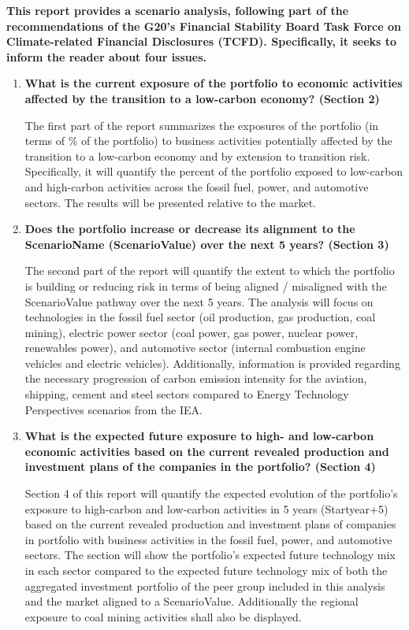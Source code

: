 \documentclass[10pt,table,a4]{article}\usepackage[]{graphicx}\usepackage[]{color}
\begin{document}
	\begin{multicols}{2}
		
		\textbf{This report provides a scenario analysis, following part of the recommendations of the G20's Financial Stability Board Task Force on Climate-related Financial Disclosures (TCFD). Specifically, it seeks to inform the reader about four issues.}
		
		\begin{enumerate}
			\item{\textbf{What is the current exposure of the portfolio to economic activities affected by the transition to a low-carbon economy? (Section 2) }
			}
			
			The first part of the report summarizes the exposures of the portfolio (in terms of \% of the portfolio) to business activities potentially affected by the transition to a low-carbon economy and by extension to transition risk. Specifically, it will quantify the percent of the portfolio exposed to low-carbon and high-carbon activities across the fossil fuel, power, and automotive sectors. The results will be presented relative to the market.
			
			\item{\textbf{Does the portfolio increase or decrease its alignment to the ScenarioName (ScenarioValue) over the next 5 years? (Section 3)}
			}
			
			The second part of the report will quantify the extent to which the portfolio is building or reducing risk in terms of being aligned / misaligned with the ScenarioValue pathway over the next 5 years. The analysis will focus on technologies in the fossil fuel sector (oil production, gas production, coal mining), electric power sector (coal power, gas power, nuclear power, renewables power), and automotive sector (internal combustion engine vehicles and electric vehicles). Additionally, information is provided regarding the necessary progression of carbon emission intensity for the aviation, shipping, cement and steel sectors compared to Energy Technology Perspectives scenarios from the IEA. 
			
			\item{\textbf{What is the expected future exposure to high- and low-carbon economic activities based on the current revealed production and investment plans of the companies in the portfolio? (Section 4)}
			}
			
			Section 4 of this report will quantify the expected evolution of the portfolio's exposure to high-carbon and low-carbon activities in 5 years (Startyear+5) based on the current revealed production and investment plans of companies in portfolio with business activities in the fossil fuel, power, and automotive sectors. The section will show the portfolio's expected future technology mix in each sector compared to the expected future technology mix of both the aggregated investment portfolio of the peer group included in this analysis and the market aligned to a ScenarioValue. Additionally the regional exposure to coal mining activities shall also be displayed. 
			

\end{enumerate}
\end{multicols}
\end{document}
